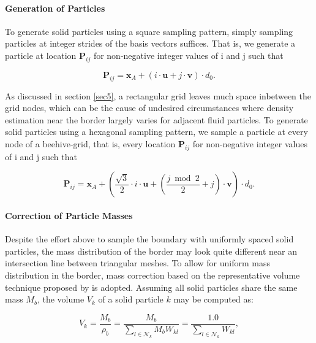 \documentclass[
	11pt, 
	DIV10,
	ngerman,
	a4paper, 
	oneside, 
	headings=normal, 
	captions=tableheading,
	final, 
	numbers=noenddot
]{scrartcl}
\begin{document}
\paragraph{Generation of Particles} To generate solid particles using a square sampling pattern, simply sampling particles at integer strides of the basis vectors suffices. That is, we generate a particle at location $ \boldsymbol{P}_{ij} $ for non-negative integer values of i and j such that

\begin{equation}
	\label{eq8}
	\boldsymbol{P}_{ij} = \boldsymbol{x}_{A} + \left(i \cdot \boldsymbol{u} + j \cdot \boldsymbol{v}\right) \cdot d_{0}.
\end{equation}

As discussed in section \ref{sec5}, a rectangular grid leaves much space inbetween the grid nodes, which can be the cause of undesired circumstances where density estimation near the border largely varies for adjacent fluid particles. To generate solid particles using a hexagonal sampling pattern, we sample a particle at every node of a beehive-grid, that is, every location $ \boldsymbol{P}_{ij} $ for non-negative integer values of i and j such that

\begin{equation}
	\label{eq9}
	\boldsymbol{P}_{ij} = \boldsymbol{x}_{A} + \left(\frac{\sqrt{3}}{2} \cdot i \cdot \boldsymbol{u} + \left( \frac{j \bmod 2}{2} + j\right) \cdot \boldsymbol{v}\right) \cdot d_{0}.
\end{equation}

\paragraph{Correction of Particle Masses} Despite the effort above to sample the boundary with uniformly spaced solid particles, the mass distribution of the border may look quite different near an intersection line between triangular meshes. To allow for uniform mass distribution in the border, mass correction based on the representative volume technique proposed by \cite{akinci2012versatile} is adopted. Assuming all solid particles share the same mass $ M_{b} $, the volume $ V_{k} $ of a solid particle $ k $ may be computed as:

\begin{equation}
	\label{eq10}
    V_{k} = \frac{M_{b}}{\rho_{b}} = \frac{M_{b}}{\sum_{l \in \mathcal{N}_{k}} M_{b} W_{kl}} = \frac{1.0}{\sum_{l \in \mathcal{N}_{k}} W_{kl}},
\end{equation}
\end{document}
